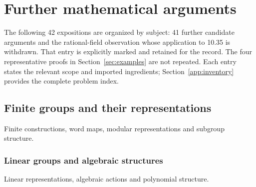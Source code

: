 \section{Further mathematical arguments}
\label{app:candidates}
The following 42 expositions are organized by subject: 41 further candidate
arguments and the rational-field observation whose application to 10.35
is withdrawn. That entry is explicitly marked and retained for the record.
The four representative proofs in Section~\ref{sec:examples} are not
repeated. Each entry states the relevant scope and imported ingredients;
Section~\ref{app:inventory} provides the complete problem index.

\subsection{Finite groups and their representations}
\label{portfolio:finite}
Finite constructions, word maps, modular representations and subgroup structure.
\begingroup
\let\subsection\subsubsection









\endgroup

\subsection{Linear groups and algebraic structures}
\label{portfolio:linear}
Linear representations, algebraic actions and polynomial structure.
\begingroup
\let\subsection\subsubsection













\endgroup

